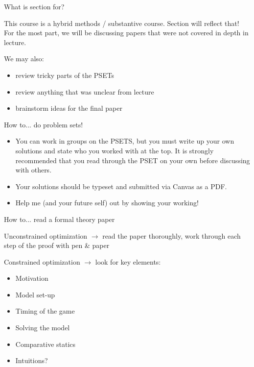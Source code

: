\documentclass[aspectratio=169]{beamer}
\begin{document}
\begin{frame}{What is section for?}

This course is a hybrid methods / substantive course. Section will reflect that! For the most part, we will be discussing papers that were not covered in depth in lecture. 

\pause 
We may also:

\begin{itemize}
\item review tricky parts of the PSETs
\pause
\item review anything that was unclear from lecture
\pause
\item brainstorm ideas for the final paper
\end{itemize}


\end{frame}


\begin{frame}{How to... do problem sets!}

\Large

\begin{itemize}
\setlength \itemsep{0.8em}
\item You can work in groups on the PSETS, but \alert{you must write up your own solutions} and state who you worked with at the top. It is strongly recommended that you read through the PSET on your own before discussing with others.
\pause

\item Your solutions should be typeset and submitted via Canvas as a PDF.
\pause

\item Help me (and your future self) out by showing your working!

\end{itemize}

\end{frame}
\begin{frame}{How to... read a formal theory paper}

\alert{Unconstrained optimization} $\rightarrow$ read the paper thoroughly, work through each step of the proof with pen \& paper

\pause

\alert{Constrained optimization} $\rightarrow$ look for key elements:

\pause 

\begin{itemize}

\item Motivation
\item Model set-up
\item Timing of the game
\item Solving the model
\item Comparative statics
\item Intuitions?

\end{itemize}
\end{frame}
\end{document}
